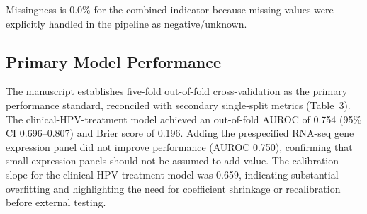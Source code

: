 \documentclass[11pt]{article}
\begin{document}
\begin{table}[H]
\centering
\caption{Source-field audit and missingness handling for key enriched fields.}
\scriptsize
{}
\begin{tablenotes}[flushleft]\footnotesize
\item *Missingness is 0.0\% for the combined indicator because missing values were explicitly handled in the pipeline as negative/unknown.
\end{tablenotes}
\end{table}

\subsection{Primary Model Performance}
The manuscript establishes five-fold out-of-fold cross-validation as the primary performance standard, reconciled with secondary single-split metrics (Table~3). The clinical-HPV-treatment model achieved an out-of-fold AUROC of 0.754 (95\% CI 0.696--0.807) and Brier score of 0.196. Adding the prespecified RNA-seq gene expression panel did not improve performance (AUROC 0.750), confirming that small expression panels should not be assumed to add value. The calibration slope for the clinical-HPV-treatment model was 0.659, indicating substantial overfitting and highlighting the need for coefficient shrinkage or recalibration before external testing.
\end{document}
